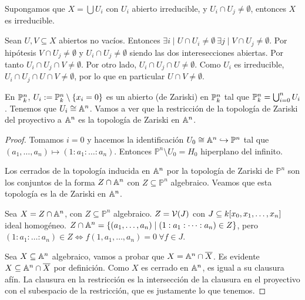\documentclass[ACGA.tex]{subfiles}
\begin{document}
\begin{prop}
Supongamos que $X=\bigcup U_i$ con $U_i$ abierto irreducible, y $U_i\cap U_j\neq\emptyset$, entonces $X$ es irreducible.
\end{prop}
\begin{dem}
Sean $U,V\subseteq X$ abiertos no vacíos. Entonces $\exists i\mid U\cap U_i\neq\emptyset\ \exists j\mid V\cap U_j\neq\emptyset$. Por hipótesis $V\cap U_j\neq\emptyset$ y $U_i\cap U_j\neq\emptyset$ siendo las dos interesecciones abiertas. Por tanto $U_i\cap U_j\cap V\neq\emptyset$. Por otro lado, $U_i\cap U_j\cap U\neq\emptyset$. Como $U_i$ es irreducible, $U_i\cap U_j\cap U\cap V\neq\emptyset$, por lo que en particular $U\cap V\neq\emptyset$.  \QED
\end{dem}
En $\mathbb{P}^n_k$, $U_i:=\mathbb{P}^n_k\setminus\{x_i=0\}$ es un abierto (de Zariski) en $\mathbb{P}^n_k$ tal que $\mathbb{P}^n_k=\bigcup_{i=0}^n U_i$. Tenemos que $U_i\cong\mathbb{A}^n$. Vamos a ver que la restricción de la topología de Zariski del proyectivo a $\mathbb{A}^n$ es la topología de Zariski en $\mathbb{A}^n$. 
\begin{proof}
Tomamos $i=0$ y hacemos la identificación $U_0\cong \mathbb{A}^n\hookrightarrow\mathbb{P}^n$ tal que $(a_1,\dots,a_n)\mapsto(1:a_1:\dots :a_n)$. Entonces $\mathbb{P}^n\setminus U_0=H_0$ hiperplano del infinito. 

Los cerrados de la topología inducida en $\mathbb{A}^n$ por la topología de Zariski de $\mathbb{P}^n$ son los conjuntos de la forma $Z\cap\mathbb{A}^n$ con $Z\subseteq\mathbb{P}^n$ algebraico. Veamos que esta topología es la de Zariski en $\mathbb{A}^n$.

Sea $X=Z\cap\mathbb{A}^n$, con $Z\subseteq\mathbb{P}^n$ algebraico. $Z=\mathcal{V}(J)$ con $J\subseteq k[x_0,x_1,\dotsc,x_{n}]$ ideal homogéneo. $Z\cap\mathbb{A}^n=\{(a_1,\dots,a_n)\mid (1:a_1:\dots:a_n)\in Z\}$, pero $(1:a_1:\dots:a_n)\in Z\Leftrightarrow f(1,a_1,\dots,a_n)=0\ \forall f\in J$. 

Sea $X\subseteq\mathbb{A}^n$ algebraico, vamos a probar que $X=\mathbb{A}^n\cap\overline{X}$. Es evidente $X\subseteq\mathbb{A}^n\cap\overline{X}$ por definición. Como $X$ es cerrado en $\mathbb{A}^n$, es igual a su clausura afín. La clausura en la restricción es la intersección de la clausura en el proyectivo con el subespacio de la restricción, que es justamente lo que tenemos. 


\end{proof}
\end{document}
